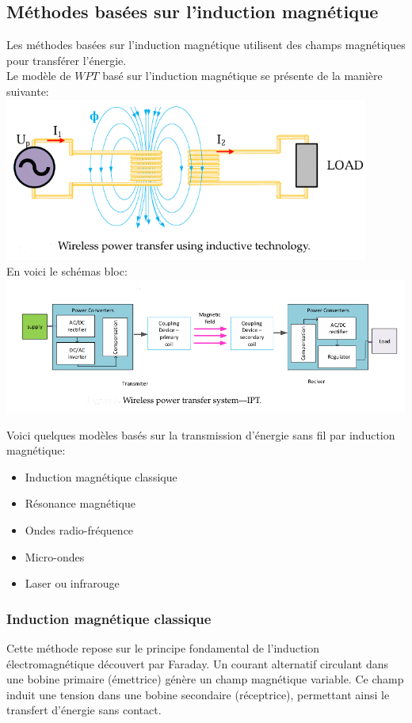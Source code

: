 \documentclass[12pt,a4paper,titlepage,notitlepage]{article}
\begin{document}
	\subsection{Méthodes basées sur l’induction magnétique}
	Les méthodes basées sur l'induction magnétique utilisent des champs magnétiques pour transférer l'énergie.\\
	
	Le  modèle de $WPT$ basé sur l'induction magnétique se présente de la manière suivante:\\
	\includegraphics[width=0.9\textwidth]{WPT_inductif} \\ En voici le schémas bloc:\\
	\includegraphics[width=1.1\textwidth]{WPT_inductif_1}
	
	Voici quelques modèles basés sur la transmission d'énergie sans fil par induction magnétique:
	\begin{itemize}
		\item Induction magnétique classique
		\item Résonance magnétique
		\item Ondes radio-fréquence
		\item Micro-ondes
		\item Laser ou infrarouge
	\end{itemize}
	\subsubsection{Induction magnétique classique}
	Cette méthode repose sur le principe fondamental de l’induction électromagnétique découvert par Faraday. Un courant alternatif circulant dans une bobine primaire (émettrice) génère un champ magnétique variable. Ce champ induit une tension dans une bobine secondaire (réceptrice), permettant ainsi le transfert d’énergie sans contact.
	
\end{document}
